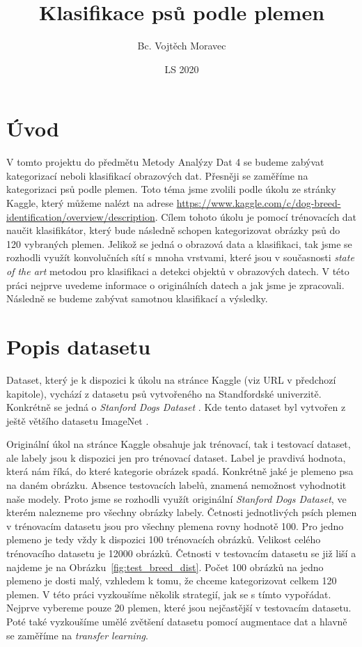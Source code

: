 \documentclass[a4paper,12pt]{article}
\author{Bc. Vojtěch Moravec}
\title{Klasifikace psů podle plemen}
\date{LS 2020}
\begin{document}
\maketitle
\newpage

\section{Úvod}
V tomto projektu do předmětu Metody Analýzy Dat 4 se budeme zabývat kategorizací neboli klasifikací obrazových dat. Přesněji se zaměříme na kategorizaci psů podle plemen. Toto téma jsme zvolili podle úkolu ze stránky Kaggle, který můžeme nalézt na adrese \linebreak \url{https://www.kaggle.com/c/dog-breed-identification/overview/description}.  \linebreak Cílem tohoto úkolu je pomocí trénovacích dat naučit klasifikátor, který bude následně schopen kategorizovat obrázky psů do 120 vybraných plemen. Jelikož se jedná o obrazová data a klasifikaci, tak jsme se rozhodli využít konvolučních sítí s mnoha vrstvami, které jsou v současnosti \emph{state of the art} metodou pro klasifikaci a detekci objektů v obrazových datech. V této práci nejprve uvedeme informace o originálních datech a jak jsme je zpracovali. Následně se budeme zabývat samotnou klasifikací a výsledky.

\section{Popis datasetu}
Dataset, který je k dispozici k úkolu na stránce Kaggle (viz URL v předchozí kapitole), vychází z datasetu psů vytvořeného na Standfordské univerzitě. Konkrétně se jedná \linebreak o \emph{Stanford Dogs Dataset} \cite{KhoslaYaoJayadevaprakashFeiFei_FGVC2011}. Kde tento dataset byl vytvořen z ještě většího datasetu ImageNet \cite{imagenet_cvpr09}.

Originální úkol na stránce Kaggle obsahuje jak trénovací, tak i testovací dataset, ale labely jsou k dispozici jen pro trénovací dataset. Label je pravdivá hodnota, která nám říká, do které kategorie obrázek spadá. Konkrétně jaké je plemeno psa na daném obrázku. Absence testovacích labelů, znamená nemožnost vyhodnotit naše modely. Proto jsme se rozhodli využít originální \emph{Stanford Dogs Dataset}, ve kterém nalezneme pro všechny obrázky labely. Četnosti jednotlivých psích plemen v trénovacím datasetu jsou pro všechny plemena rovny hodnotě 100. Pro jedno plemeno je tedy vždy k dispozici 100 trénovacích obrázků. Velikost celého trénovacího datasetu je 12000 obrázků. Četnosti v testovacím datasetu se již liší a najdeme je na Obrázku~\ref{fig:test_breed_dist}. Počet 100 obrázků na jedno plemeno je dosti malý, vzhledem k tomu, že chceme kategorizovat celkem 120 plemen. V této práci vyzkoušíme několik strategií, jak se s tímto vypořádat. Nejprve vybereme pouze 20 plemen, které jsou nejčastější v testovacím datasetu. Poté také vyzkoušíme umělé zvětšení datasetu pomocí augmentace dat a hlavně se zaměříme na \emph{transfer learning}.
\end{document}
